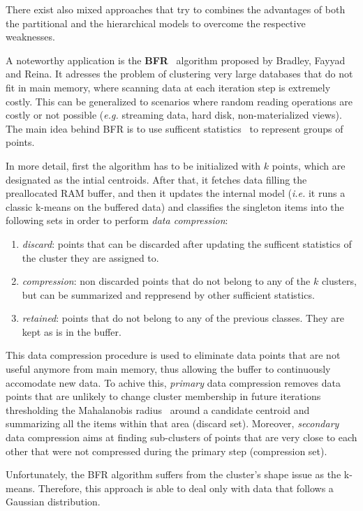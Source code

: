 There exist also mixed approaches that try to combines the advantages of both the partitional and the hierarchical models to overcome the respective weaknesses.

A noteworthy application is the \textbf{BFR}~\cite{bradley1998scaling} algorithm proposed by Bradley, Fayyad and Reina.
It adresses the problem of clustering very large databases that do not fit in main memory, where scanning data at each iteration step is extremely costly. This can be generalized to scenarios where random reading operations are costly or not possible (\emph{e.g.} streaming data, hard disk, non-materialized views).
The main idea behind BFR is to use sufficent statistics~\cite{fisher1922mathematical} to represent groups of points.

In more detail, first the algorithm has to be initialized with $k$ points, which are designated as the intial centroids.
After that, it fetches data filling the preallocated RAM buffer, and then
it updates the internal model (\emph{i.e.} it runs a classic k-means on the buffered data) and classifies the
singleton items into the following sets in order to perform \emph{data compression}:
\begin{enumerate}
    \item \emph{discard}: points that can be discarded after updating the sufficent statistics of the cluster they are assigned to.
    \item \emph{compression}: non discarded points that do not belong to any of the $k$ clusters,
        but can be summarized and reppresend by other sufficient statistics.
    \item \emph{retained}: points that do not belong to any of the previous classes.
        They are kept as is in the buffer.
\end{enumerate}
This data compression procedure is used to eliminate data points that are not useful anymore from main memory, thus allowing
the buffer to continuously accomodate new data.
To achive this, \emph{primary} data compression removes data points that are unlikely to change cluster membership in future
iterations thresholding the Mahalanobis radius~\cite{duda60} around a candidate centroid and summarizing all the items within that area (discard set).
Moreover, \emph{secondary} data compression aims at finding sub-clusters of points that are very close to each other that
were not compressed during the primary step (compression set).

Unfortunately, the BFR algorithm suffers from the cluster's shape issue as the k-means. Therefore, this approach is able to deal only with
data that follows a Gaussian distribution.
